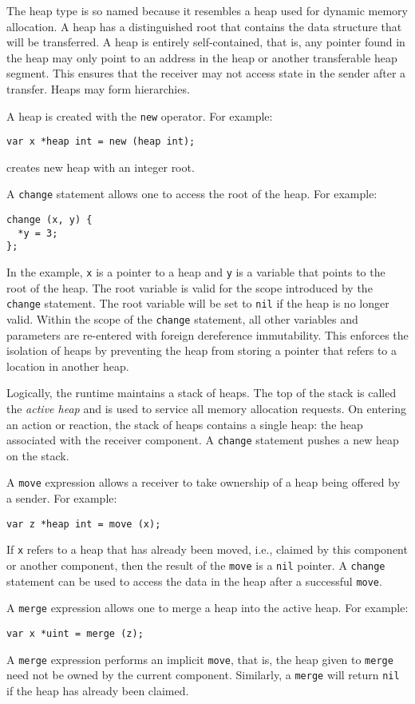 The heap type is so named because it resembles a heap used for dynamic memory allocation.
A heap has a distinguished root that contains the data structure that will be transferred.
A heap is entirely self-contained, that is, any pointer found in the heap may only point to an address in the heap or another transferable heap segment.
This ensures that the receiver may not access state in the sender after a transfer.
Heaps may form hierarchies.

A heap is created with the \verb+new+ operator.
For example:
\begin{verbatim}
var x *heap int = new (heap int);
\end{verbatim}
creates new heap with an integer root.

A \verb+change+ statement allows one to access the root of the heap.
For example:
\begin{verbatim}
change (x, y) {
  *y = 3;
};
\end{verbatim}
In the example, \verb+x+ is a pointer to a heap and \verb+y+ is a variable that points to the root of the heap.
The root variable is valid for the scope introduced by the \verb+change+ statement.
The root variable will be set to \verb+nil+ if the heap is no longer valid.
Within the scope of the \verb+change+ statement, all other variables and parameters are re-entered with foreign dereference immutability.
This enforces the isolation of heaps by preventing the heap from storing a pointer that refers to a location in another heap.

Logically, the runtime maintains a stack of heaps.
The top of the stack is called the \emph{active heap} and is used to service all memory allocation requests.
On entering an action or reaction, the stack of heaps contains a single heap:  the heap associated with the receiver component.
A \verb+change+ statement pushes a new heap on the stack.

A \verb+move+ expression allows a receiver to take ownership of a heap being offered by a sender.
For example:
\begin{verbatim}
var z *heap int = move (x);
\end{verbatim}
If \verb+x+ refers to a heap that has already been moved, i.e., claimed by this component or another component, then the result of the \verb+move+ is a \verb+nil+ pointer.
A \verb+change+ statement can be used to access the data in the heap after a successful \verb+move+.

A \verb+merge+ expression allows one to merge a heap into the active heap.
For example:
\begin{verbatim}
var x *uint = merge (z);
\end{verbatim}
A \verb+merge+ expression performs an implicit \verb+move+, that is, the heap given to \verb+merge+ need not be owned by the current component.
Similarly, a \verb+merge+ will return \verb+nil+ if the heap has already been claimed.

